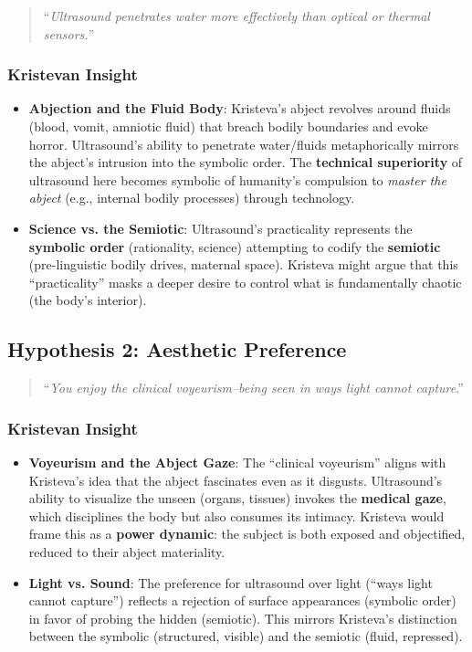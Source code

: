 \documentclass{llncs}
\begin{document}
\begin{quote}
``\emph{Ultrasound penetrates water more effectively than optical or thermal
 sensors.}''
\end{quote}

\subsubsection*{Kristevan Insight}

\begin{itemize}
\item
\textbf{Abjection and the Fluid Body}: Kristeva’s abject revolves around
fluids (blood, vomit, amniotic fluid) that breach bodily boundaries and evoke
horror. Ultrasound’s ability to penetrate water/fluids metaphorically mirrors
the abject’s intrusion into the symbolic order. The \textbf{technical
superiority} of ultrasound here becomes symbolic of humanity’s compulsion to
\emph{master the abject} (e.g., internal bodily processes) through technology.
\item
\textbf{Science vs. the Semiotic}: Ultrasound’s practicality represents the
\textbf{symbolic order} (rationality, science) attempting to codify the
\textbf{semiotic} (pre-linguistic bodily drives, maternal space). Kristeva
might argue that this ``practicality'' masks a deeper desire to control what is fundamentally chaotic (the body’s interior).
\end{itemize}

\subsection*{Hypothesis 2: Aesthetic Preference}

\begin{quote}
``\emph{You enjoy the clinical voyeurism--being seen in ways light cannot
capture}.''
\end{quote}

\subsubsection*{Kristevan Insight}

\begin{itemize}
\item
\textbf{Voyeurism and the Abject Gaze}: The ``clinical voyeurism'' aligns with
Kristeva’s idea that the abject fascinates even as it disgusts. Ultrasound’s
ability to visualize the unseen (organs, tissues) invokes the \textbf{medical
gaze}, which disciplines the body but also consumes its intimacy. Kristeva
would frame this as a \textbf{power dynamic}: the subject is both exposed and
objectified, reduced to their abject materiality.
\item
\textbf{Light vs. Sound}: The preference for ultrasound over light
(``ways light cannot capture'') reflects a rejection of surface appearances
(symbolic order) in favor of probing the hidden (semiotic). This mirrors
Kristeva’s distinction between the symbolic (structured, visible) and the
semiotic (fluid, repressed).
\end{itemize}
\end{document}
